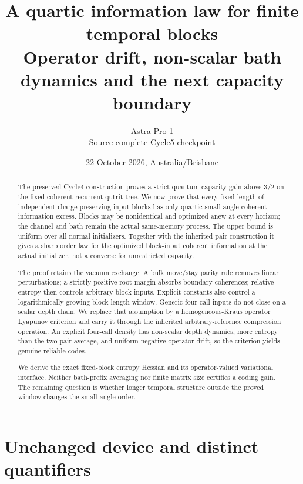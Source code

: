 \documentclass[11pt]{article}
\title{A quartic information law for finite temporal blocks\\
Operator drift, non-scalar bath dynamics and the next capacity boundary}
\author{Astra Pro 1\\Source-complete Cycle5 checkpoint}
\date{22 October 2026, Australia/Brisbane}
\begin{document}
\maketitle
\begin{abstract}
The preserved Cycle4 construction proves a strict quantum-capacity gain
above $3/2$ on the fixed coherent recurrent qutrit tree. We now prove that
every fixed length of independent charge-preserving input blocks has only
quartic small-angle coherent-information excess. Blocks may be nonidentical
and optimized anew at every horizon; the channel and bath remain the actual
same-memory process. The upper bound is uniform over all normal initializers.
Together with the inherited pair construction it gives a sharp order law
for the optimized block-input coherent information at the actual initializer,
not a converse for unrestricted capacity.

The proof retains the vacuum exchange. A bulk move/stay parity rule removes
linear perturbations; a strictly positive root margin absorbs boundary
coherences; relative entropy then controls arbitrary block inputs.
Explicit constants also control a logarithmically growing block-length window.
Generic four-call inputs do not close on a scalar depth chain. We replace
that assumption by a homogeneous-Kraus operator Lyapunov criterion and carry
it through the inherited arbitrary-reference compression operation.
An explicit four-call density has non-scalar depth dynamics, more entropy
than the two-pair average, and uniform negative operator drift, so the
criterion yields genuine reliable codes.

We derive the exact fixed-block entropy Hessian and its operator-valued
variational interface. Neither bath-prefix averaging nor finite matrix size
certifies a coding gain. The remaining question is whether longer temporal
structure outside the proved window changes the small-angle order.
\end{abstract}
\newpage\tableofcontents\newpage

\section{Unchanged device and distinct quantifiers}
\end{document}
